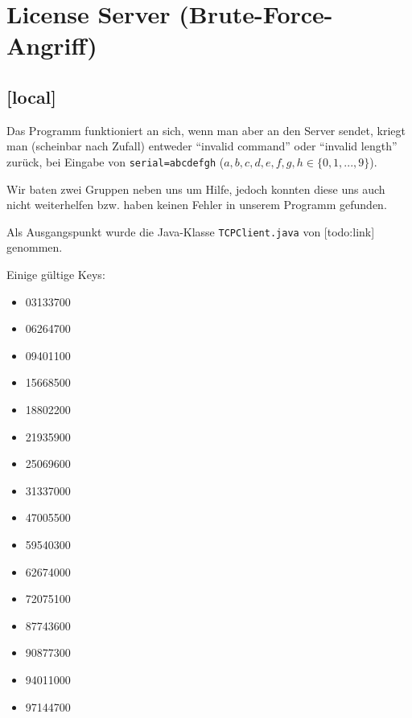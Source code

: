 \documentclass[twoside]{article}
\newcommand{\say}[1]{%
	``#1''%
}
\newcommand{\ttt}[1]{%
	\texttt{#1}%
}
\begin{document}
\section{License Server (Brute-Force-Angriff)}
\subsection{[local]}
Das Programm funktioniert an sich, wenn man aber an den Server sendet, kriegt man (scheinbar nach Zufall) entweder \say{invalid command} oder \say{invalid length} zurück, bei Eingabe von \ttt{serial=abcdefgh} ($a,b,c,d,e,f,g,h \in \{0,1,...,9\}$).

Wir baten zwei Gruppen neben uns um Hilfe, jedoch konnten diese uns auch nicht weiterhelfen bzw. haben keinen Fehler in unserem Programm gefunden.

Als Ausgangspunkt wurde die Java-Klasse \ttt{TCPClient.java} von [todo:link] genommen.

Einige gültige Keys:\\
\begin{center}
\begin{minipage}[t]{0.23\textwidth}
	\begin{itemize}
		\item 03133700
		\item 06264700
		\item 09401100
		\item 15668500
	\end{itemize}
\end{minipage}
\begin{minipage}[t]{0.23\textwidth}
	\begin{itemize}
		\item 18802200
		\item 21935900
		\item 25069600
		\item 31337000
	\end{itemize}
\end{minipage}
\begin{minipage}[t]{0.23\textwidth}
	\begin{itemize}
		\item 47005500
		\item 59540300
		\item 62674000
		\item 72075100
	\end{itemize}
\end{minipage}
\begin{minipage}[t]{0.23\textwidth}
	\begin{itemize}
		\item 87743600
		\item 90877300
		\item 94011000
		\item 97144700
	\end{itemize}
\end{minipage}
\end{center}
\end{document}
